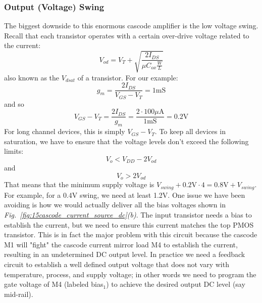 \subsubsection{Output (Voltage) Swing}
The biggest downside to this enormous cascode amplifier is the low voltage swing.  Recall that each transistor operates with a certain over-drive voltage related to the current:
    \begin{equation}
        V_{od} = V_T + \sqrt{\frac{2 I_{DS}}{\mu C_{ox} \frac{W}{L}}} 
    \end{equation}
also known as the $V_{dsat}$ of a transistor.  For our example:
    \begin{equation} 
        {g_m} = \frac{{2{I_{DS}}}}{{{V_{GS}} - {V_T}}} = 1\mathrm{mS} 
    \end{equation}
and so
    \begin{equation}
        {V_{GS}} - {V_T} = \frac{{2{I_{DS}}}}{{{g_m}}} = \frac{{2 \cdot100\mu \mathrm{A}}}{{1\mathrm{mS}}} = 0.2\mathrm{V} 
    \end{equation}
For long channel devices, this is simply $V_{GS} - V_T$.  To keep all devices in saturation, we have to ensure that the voltage levels don't exceed the following limits:
    \begin{equation}
        V_{o} < V_{DD} - 2 V_{od}
    \end{equation} 
and
    \begin{equation}
        V_{o} >  2 V_{od}
    \end{equation} 
That means that the minimum supply voltage is $V_{swing} + 0.2\mathrm{V} \cdot 4 = 0.8\mathrm{V} + V_{swing}$.  For example, for a 0.4V swing, we need at least 1.2V.  
One issue we have been avoiding is how we would actually deliver all the bias voltages shown in \emph{Fig.~\ref{fig:15cascode_current_source_dc}(b)}.  The input transistor needs a bias to establish the current, but we need to ensure this current matches the top PMOS transistor.  This is in fact the major problem with this circuit because the cascode M1 will "fight" the cascode current mirror load M4 to establish the current, resulting in an undetermined DC output level.  In practice we need a feedback circuit to establish a well defined output voltage that does not vary with temperature, process, and supply voltage; in other words we need to program the gate voltage of M4 (labeled bias$_1$) to achieve the desired output DC level (say mid-rail).
